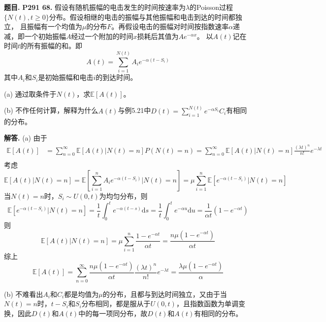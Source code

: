 \documentclass[12pt, a4paper, oneside]{ctexart}
\newcounter{problem}  %
\newenvironment{problem}[1][]{\stepcounter{problem}\par\noindent\textbf{题目\arabic{problem}. #1}}{\smallskip\par}
\newenvironment{solution}[1][]{\par\noindent\textbf{#1解答. }}{\smallskip\par}  %
\def\E{\mathbb{E}}          %
\def\d{\mathrm{d}}          %
\begin{document}
\begin{problem}
    \textbf{P291 68.}
    假设有随机振幅的电击发生的时间按速率为$\lambda$的Poisson过程$\{N(t),t\geqslant 0\}$分布。假设相继的电击的振幅与其他振幅和电击到达的时间都独立，
    且振幅有一个均值为$\mu$的分布$F$。再假设电击的振幅对时间按指数速率$\alpha$递减，即一个初始振幅$A$经过一个附加的时间$x$损耗后其值为$Ae^{-\alpha x}$。
    以$A(t)$记在时间$t$的所有振幅的和。即
    \begin{equation*}
        A(t) = \sum_{i=1}^{N(t)}A_i e^{-\alpha(t-S_i)}
    \end{equation*}
    其中$A_i$和$S_i$是初始振幅和电击$i$的到达时间。

    (a) 通过取条件于$N(t)$，求$\E[A(t)]$。

    (b) 不作任何计算，解释为什么$A(t)$与例5.21中$D(t) = \sum_{i=1}^{N(t)}e^{-\alpha S_i}C_i$有相同的分布。
\end{problem}
\begin{solution}
    (a) 由于
    \begin{align*}
        \E[A(t)] &= \sum_{n=0}^\infty \E[A(t)|N(t)=n]P(N(t)=n) = \sum_{n=0}^\infty \E[A(t)|N(t)=n]\frac{(\lambda t)^n}{n!}e^{-\lambda t} \\
    \end{align*}
    考虑
    \begin{equation*}
        \E[A(t)|N(t)=n] = \E[\sum_{i=1}^nA_ie^{-\alpha(t-S_i)}|N(t)=n] = \mu\sum_{i=1}^n\E[e^{-\alpha(t-S_i)}|N(t)=n]
    \end{equation*}
    当$N(t)=n$时，$S_i\sim U(0,t)$为均匀分布，则
    \begin{equation*}
        \E[e^{-\alpha(t-S_i)}|N(t)=n] = \frac{1}{t}\int_0^t e^{-\alpha(t-s)}\d s = \frac{1}{t}\int_0^t e^{-\alpha u}\d u = \frac{1}{\alpha t}(1-e^{-\alpha t})
    \end{equation*}
    则
    \begin{equation*}
        \E[A(t)|N(t)=n] = \mu\sum_{i=1}^n\frac{1-e^{-\alpha t}}{\alpha t} = \frac{n\mu(1-e^{-\alpha t})}{\alpha t}
    \end{equation*}
    综上
    \begin{equation*}
        \E[A(t)] = \sum_{n=0}^\infty \frac{n\mu(1-e^{-\alpha t})}{\alpha t}\frac{(\lambda t)^n}{n!}e^{-\lambda t} = \frac{\lambda\mu(1-e^{-\alpha t})}{\alpha}
    \end{equation*}

    (b) 不难看出$A_i$和$C_i$都是均值为$\mu$的分布，且都与到达时间独立，又由于当$N(t) = n$时，$t-S_i$和$S_i$分布相同，都是服从于$U(0, t)$，且指数函数为单调变换，因此$D(t)$和$A(t)$中的每一项同分布，故$D(t)$和$A(t)$有相同的分布。
\end{solution}
\end{document}
